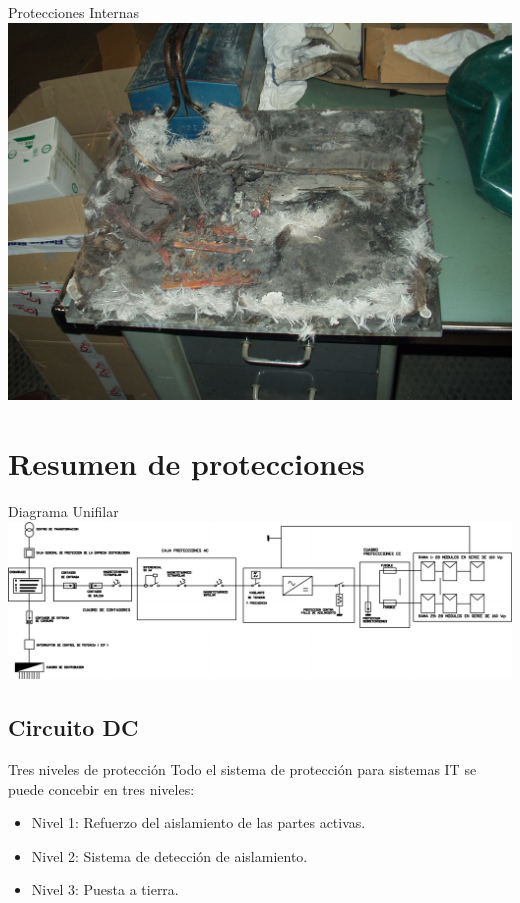 \documentclass[xcolor={usenames,svgnames,dvipsnames}]{beamer}
\begin{document}
\begin{frame}[label=sec-4-2-8]{Protecciones Internas}
\includegraphics[width=.9\linewidth]{../figs/CajaForumDestruida.pdf}
\end{frame}

\section{Resumen de protecciones}
\label{sec-5}

\begin{frame}[label=sec-5-0-1]{Diagrama Unifilar}
\includegraphics[width=.9\linewidth]{../figs/UnifilarCR1.pdf}
\end{frame}

\subsection{Circuito DC}
\label{sec-5-1}

\begin{frame}[label=sec-5-1-1]{Tres niveles de protección}
Todo el sistema de protección para sistemas IT se puede concebir en tres
niveles:

\begin{itemize}
\item Nivel 1: Refuerzo del aislamiento de las partes activas.

\item Nivel 2: Sistema de detección de aislamiento.

\item Nivel 3: Puesta a tierra.
\end{itemize}
\end{frame}
\end{document}
